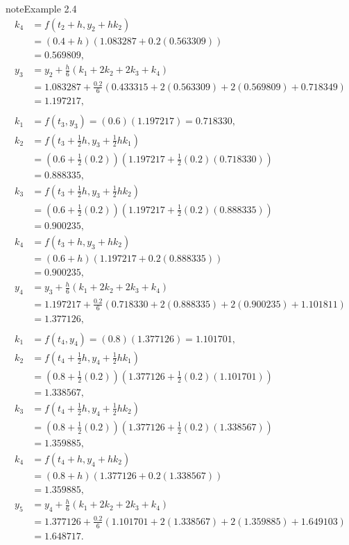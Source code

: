 \documentclass[letterpaper,10pt,english]{jupyterBook}
\begin{document}
\begin{sphinxadmonition}{note}{Example 2.4}
\begin{align*}
    k_4 &= f(t_2 + h, y_2 + hk_2) \\
    &= (0.4 + h)(1.083287 + 0.2(0.563309)) \\
    &= 0.569809, \\
    y_3 &= y_2 + \frac{h}{6}(k_1 + 2k_2 + 2k_3 + k_4) \\
    &= 1.083287 + \frac{0.2}{6}(0.433315 + 2(0.563309) + 2(0.569809) + 0.718349) \\
    &= 1.197217, \\
    \\
    k_1 &= f(t_3, y_3) = (0.6)(1.197217) = 0.718330, \\
    k_2 &= f(t_3 + \frac{1}{2}h, y_3 + \frac{1}{2}hk_1) \\
    &= (0.6 + \frac{1}{2}(0.2))(1.197217 + \frac{1}{2}(0.2)(0.718330)) \\
    &= 0.888335, \\
    k_3 &= f(t_3 + \frac{1}{2}h, y_3 + \frac{1}{2}hk_2) \\
    &= (0.6 + \frac{1}{2}(0.2))(1.197217 + \frac{1}{2}(0.2)(0.888335)) \\
    &= 0.900235, \\
    k_4 &= f(t_3 + h, y_3 + hk_2) \\
    &= (0.6 + h)(1.197217 + 0.2(0.888335)) \\
    &= 0.900235, \\
    y_4 &= y_3 + \frac{h}{6}(k_1 + 2k_2 + 2k_3 + k_4) \\
    &= 1.197217 + \frac{0.2}{6}(0.718330 + 2(0.888335) + 2(0.900235) + 1.101811) \\
    &= 1.377126, \\
    \\
    k_1 &= f(t_4, y_4) = (0.8)(1.377126) = 1.101701, \\
    k_2 &= f(t_4 + \frac{1}{2}h, y_4 + \frac{1}{2}hk_1) \\
    &= (0.8 + \frac{1}{2}(0.2))(1.377126 + \frac{1}{2}(0.2)(1.101701)) \\
    &= 1.338567, \\
    k_3 &= f(t_4 + \frac{1}{2}h, y_4 + \frac{1}{2}hk_2) \\
    &= (0.8 + \frac{1}{2}(0.2))(1.377126 + \frac{1}{2}(0.2)(1.338567)) \\
    &= 1.359885, \\
    k_4 &= f(t_4 + h, y_4 + hk_2) \\
    &= (0.8 + h)(1.377126 + 0.2(1.338567)) \\
    &= 1.359885, \\
    y_5 &= y_4 + \frac{h}{6}(k_1 + 2k_2 + 2k_3 + k_4) \\
    &= 1.377126 + \frac{0.2}{6}(1.101701 + 2(1.338567) + 2(1.359885) + 1.649103) \\
    &= 1.648717.
\end{align*}\end{sphinxadmonition}
\end{document}
